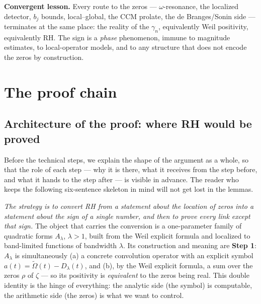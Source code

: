 \documentclass[11pt]{amsart}
\theoremstyle{definition}
\theoremstyle{remark}
\newcommand{\Om}{\widetilde{\Omega}}
\begin{document}
\noindent\textbf{Convergent lesson.} Every route to the zeros --- $\omega$-resonance, the
localized detector, $b_j$ bounds, local--global, the CCM prolate, the de Branges/Sonin side ---
terminates at the same place: the reality of the $\gamma_n$, equivalently Weil positivity,
equivalently RH. The sign is a \emph{phase} phenomenon, immune to magnitude estimates, to
local-operator models, and to any structure that does not encode the zeros by construction.

\section{The proof chain}

\subsection{Architecture of the proof: where RH would be proved}\label{sec:arch}

Before the technical steps, we explain the shape of the argument as a whole, so that the role
of each step --- why it is there, what it receives from the step before, and what it hands to
the step after --- is visible in advance. The reader who keeps the following six-sentence
skeleton in mind will not get lost in the lemmas.

\emph{The strategy is to convert RH from a statement about the location of zeros into a
statement about the sign of a single number, and then to prove every link except that sign.}
The object that carries the conversion is a one-parameter family of quadratic forms
$A_\lambda$, $\lambda>1$, built from the Weil explicit formula and localized to band-limited
functions of bandwidth $\lambda$. Its construction and meaning are \textbf{Step 1}: $A_\lambda$
is simultaneously (a) a concrete convolution operator with an explicit symbol $a(t)=\Om(t)-
D_\lambda(t)$, and (b), by the Weil explicit formula, a sum over the zeros $\rho$ of $\zeta$ ---
so its positivity is \emph{equivalent} to the zeros being real. This double identity is the
hinge of everything: the analytic side (the symbol) is computable, the arithmetic side (the
zeros) is what we want to control.
\end{document}
